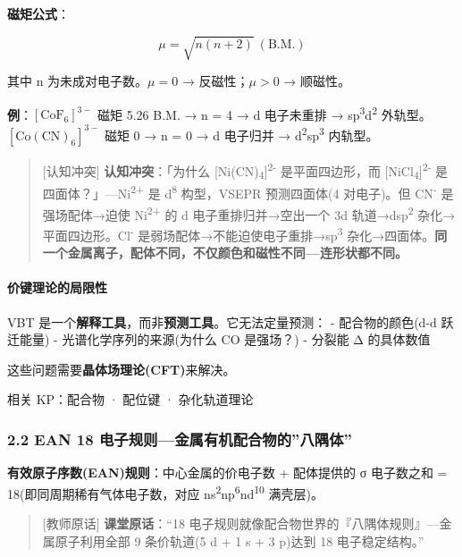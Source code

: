 \textbf{磁矩公式}：

\[
\mu = \sqrt{n(n+2)}\ (\text{B.M.})
\]

其中 n 为未成对电子数。\(\mu = 0\) → 反磁性；\(\mu > 0\) → 顺磁性。

\textbf{例}：\([\mathrm{CoF_6}]^{3-}\) 磁矩 5.26 B.M. → n = 4 → d 电子未重排 → sp\textsuperscript{3}d\textsuperscript{2} 外轨型。
\([\mathrm{Co(CN)_6}]^{3-}\) 磁矩 0 → n = 0 → d 电子归并 → d\textsuperscript{2}sp\textsuperscript{3} 内轨型。

\begin{quote}
{[}认知冲突{]} \textbf{认知冲突}：「为什么 {[}Ni(CN)\textsubscript{4}{]}\textsuperscript{2-} 是平面四边形，而 {[}NiCl\textsubscript{4}{]}\textsuperscript{2-} 是四面体？」---Ni\textsuperscript{2+} 是 d\textsuperscript{8} 构型，VSEPR 预测四面体(4 对电子)。但 CN\textsuperscript{-} 是强场配体→迫使 Ni\textsuperscript{2+} 的 d 电子重排归并→空出一个 3d 轨道→dsp\textsuperscript{2} 杂化→平面四边形。Cl\textsuperscript{-} 是弱场配体→不能迫使电子重排→sp\textsuperscript{3} 杂化→四面体。\textbf{同一个金属离子，配体不同，不仅颜色和磁性不同---连形状都不同。}
\end{quote}

\paragraph{价键理论的局限性}\label{ux4ef7ux952eux7406ux8bbaux7684ux5c40ux9650ux6027}

VBT 是一个\textbf{解释工具}，而非\textbf{预测工具}。它无法定量预测：
- 配合物的颜色(d-d 跃迁能量)
- 光谱化学序列的来源(为什么 CO 是强场？)
- 分裂能 Δ 的具体数值

这些问题需要\textbf{晶体场理论(CFT)}来解决。

相关 KP：配合物 · 配位键 · 杂化轨道理论

\subsubsection{2.2 EAN 18 电子规则---金属有机配合物的''八隅体''}\label{ean-18-ux7535ux5b50ux89c4ux5219ux91d1ux5c5eux6709ux673aux914dux5408ux7269ux7684ux516bux9685ux4f53}

\textbf{有效原子序数(EAN)规则}：中心金属的价电子数 + 配体提供的 σ 电子数之和 = 18(即同周期稀有气体电子数，对应 ns\textsuperscript{2}np\textsuperscript{6}nd\textsuperscript{10} 满壳层)。

\begin{quote}
{[}教师原话{]} \textbf{课堂原话}：``18 电子规则就像配合物世界的『八隅体规则』---金属原子利用全部 9 条价轨道(5 d + 1 s + 3 p)达到 18 电子稳定结构。''
\end{quote}

